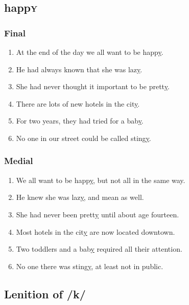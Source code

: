 	\subsection*{happ\textsc{y}}
	\label{sec:happy}

	\begin{minipage}[t]{0.49\textwidth}
		\subsubsection*{Final}
			\begin{enumerate}\footnotesize
				\item At the end of the day we all want to be happ\uline{y}.
				\item He had always known that she was laz\uline{y}.
				\item She had never thought it important to be prett\uline{y}.
				\item There are lots of new hotels in the cit\uline{y}.
				\item For two years, they had tried for a bab\uline{y}.
				\item No one in our street could be called sting\uline{y}.
			\end{enumerate}
	\end{minipage}
	\begin{minipage}[t]{0.49\textwidth}
		\subsubsection*{Medial}
			\begin{enumerate}\footnotesize
				\item We all want to be happ\uline{y}, but not all in the same way.
				\item He knew she was laz\uline{y}, and mean as well.
				\item She had never been prett\uline{y} until about age fourteen.
				\item Most hotels in the cit\uline{y} are now located downtown.
				\item Two toddlers and a bab\uline{y} required all their attention.
				\item No one there was sting\uline{y}, at least not in public.
			\end{enumerate}
	\end{minipage}

	\subsection*{Lenition of /k/}
	\label{sec:k}

